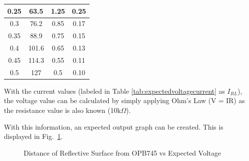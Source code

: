 \documentclass[conference]{IEEEtran}
\begin{document}
\begin{table}[H]
\begin{tabular}{|cc|cc|}
    \multicolumn{1}{|c|}{0.25}                   & 63.5                   & \multicolumn{1}{c|}{1.25}                   & 0.25                                                             \\ \hline
    \multicolumn{1}{|c|}{0.3}                    & 76.2                   & \multicolumn{1}{c|}{0.85}                   & 0.17                                                             \\ \hline
    \multicolumn{1}{|c|}{0.35}                   & 88.9                   & \multicolumn{1}{c|}{0.75}                   & 0.15                                                             \\ \hline
    \multicolumn{1}{|c|}{0.4}                    & 101.6                  & \multicolumn{1}{c|}{0.65}                   & 0.13                                                             \\ \hline
    \multicolumn{1}{|c|}{0.45}                   & 114.3                  & \multicolumn{1}{c|}{0.55}                   & 0.11                                                             \\ \hline
    \multicolumn{1}{|c|}{0.5}                    & 127                    & \multicolumn{1}{c|}{0.5}                    & 0.10                                                             \\ \hline
    \end{tabular}
\end{table}


With the current values (labeled in Table \ref{tab:expectedvoltagecurrent} as $I_{RL}$), the voltage value can be calculated by simply applying Ohm's Law (V = IR) as the resistance value is also known (10k$\Omega$).

With this information, an expected output graph can be created. This is displayed in Fig.~\ref{fig:expectedvoltage}.
\begin{figure}[htbp]
    \caption{Distance of Reflective Surface from OPB745 vs Expected Voltage}
    \label{fig:expectedvoltage}
\end{figure}
\end{document}
